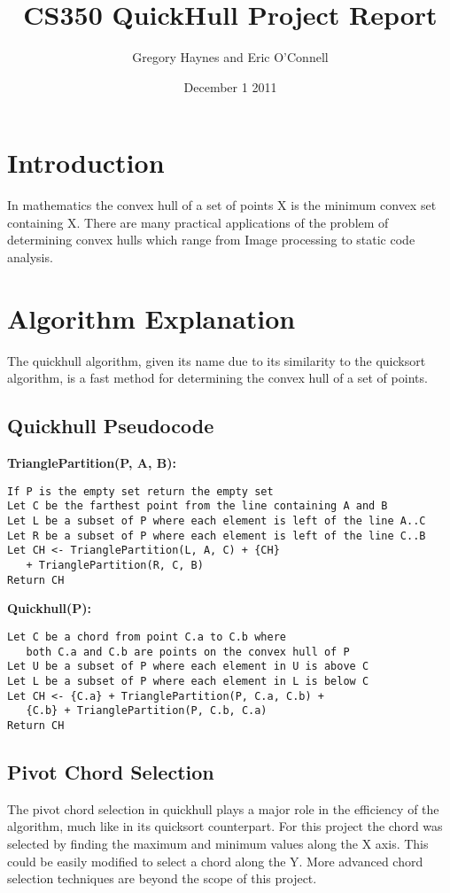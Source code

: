 \documentclass[11pt]{article}
\title{CS350 QuickHull Project Report}
\author{Gregory Haynes and Eric O'Connell}
\date{December 1 2011}
\begin{document}
\maketitle

\section{Introduction}

In mathematics the convex hull of a set of points X is the minimum convex set containing X. There are many practical applications of the problem of determining convex hulls which range from Image processing to static code analysis.

\section{Algorithm Explanation}

The quickhull algorithm, given its name due to its similarity to the quicksort algorithm, is a fast method for determining the convex hull of a set of points.

\subsection{Quickhull Pseudocode}

\textbf{TrianglePartition(P, A, B):}
\begin{verbatim}
If P is the empty set return the empty set
Let C be the farthest point from the line containing A and B
Let L be a subset of P where each element is left of the line A..C
Let R be a subset of P where each element is left of the line C..B
Let CH <- TrianglePartition(L, A, C) + {CH}
   + TrianglePartition(R, C, B)
Return CH
\end{verbatim}
\textbf{Quickhull(P):}
\begin{verbatim}
Let C be a chord from point C.a to C.b where 
   both C.a and C.b are points on the convex hull of P
Let U be a subset of P where each element in U is above C
Let L be a subset of P where each element in L is below C
Let CH <- {C.a} + TrianglePartition(P, C.a, C.b) + 
   {C.b} + TrianglePartition(P, C.b, C.a)
Return CH
\end{verbatim}

\subsection{Pivot Chord Selection}
The pivot chord selection in quickhull plays a major role in the efficiency of the algorithm, much like in its quicksort counterpart. For this project the chord was selected by finding the maximum and minimum values along the X axis. This could be easily modified to select a chord along the Y. More advanced chord selection techniques are beyond the scope of this project.
\end{document}
